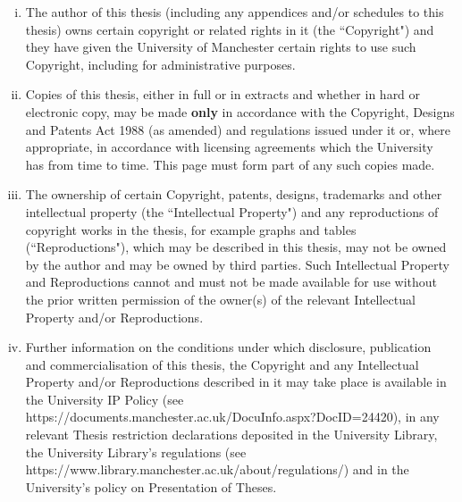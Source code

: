 \begin{enumerate}[i.]
  \item The author of this thesis (including any appendices and/or schedules to this thesis) owns certain copyright or related rights in it (the ``Copyright") and they have given the University of Manchester certain rights to use such Copyright, including for administrative purposes.
  \item Copies of this thesis, either in full or in extracts and whether in hard or electronic copy, may be made {\bf only} in accordance with the Copyright, Designs and Patents Act 1988 (as amended) and regulations issued under it or, where appropriate, in accordance with licensing agreements which the University has from time to time. This page must form part of any such copies made.
  \item The ownership of certain Copyright, patents, designs, trademarks and other intellectual property (the ``Intellectual Property") and any reproductions of copyright works in the thesis, for example graphs and tables (``Reproductions"), which may be described in this thesis, may not be owned by the author and may be owned by third parties. Such Intellectual Property and Reproductions cannot and must not be made available for use without the prior written permission of the owner(s) of the relevant Intellectual Property and/or Reproductions.
  \item Further information on the conditions under which disclosure, publication and commercialisation of this thesis, the Copyright and any Intellectual Property and/or Reproductions described in it may take place is available in the University IP Policy (see https://documents.manchester.ac.uk/DocuInfo.aspx?DocID=24420), in any relevant Thesis restriction declarations deposited in the University Library, the University Library’s regulations (see https://www.library.manchester.ac.uk/about/regulations/) and in the University’s policy on Presentation of Theses.
\end{enumerate}

